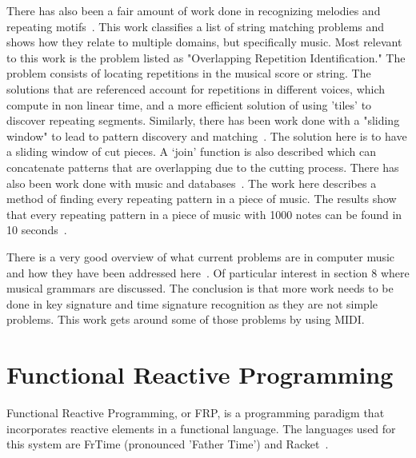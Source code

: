 \documentclass[12pt]{ucthesis}
\begin{document}
There has also been a fair amount of work done in recognizing melodies and repeating motifs~\cite{MelodicRecognition}. This work classifies a list of string matching problems and shows how they relate to multiple domains, but specifically music. Most relevant to this work is the problem listed as "Overlapping Repetition Identification." The problem consists of locating repetitions in the musical score or string. The solutions that are referenced account for repetitions in different voices, which compute in non linear time, and a more efficient solution of using 'tiles' to discover repeating segments. Similarly, there has been work done with a "sliding window" to lead to pattern discovery and matching~\cite{slidingWindow}. The solution here is to have a sliding window of cut pieces. A `join' function is also described which can concatenate patterns that are overlapping due to the cutting process. There has also been work done with music and databases~\cite{musicDB}. The work here describes a method of finding every repeating pattern in a piece of music. The results show that every repeating pattern in a piece of music with 1000 notes can be found in 10 seconds~\cite{musicDB}.

There is a very good overview of what current problems are in computer music and how they have been addressed here~\cite{Gerhard}. Of particular interest in section 8 where musical grammars are discussed. The conclusion is that more work needs to be done in key signature and time signature recognition as they are not simple problems. This work gets around some of those problems by using MIDI.

\section{Functional Reactive Programming}
\label{rw:frp}


Functional Reactive Programming, or FRP, is a programming paradigm that incorporates reactive elements in a functional language. The languages used for this system are FrTime (pronounced 'Father Time') and Racket~\cite{FrTime}.
\end{document}
